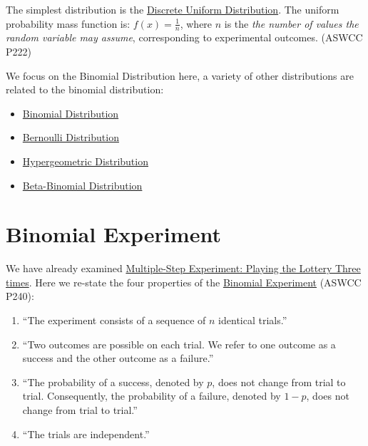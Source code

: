 \documentclass[
]{book}
\providecommand{\tightlist}{%
  \setlength{\itemsep}{0pt}\setlength{\parskip}{0pt}}
\begin{document}
The simplest distribution is the \href{https://en.wikipedia.org/wiki/Discrete_uniform_distribution}{Discrete Uniform Distribution}. The uniform probability mass function is: \(f(x) = \frac{1}{n}\), where \(n\) is the \emph{the number of values the random variable may assume}, corresponding to experimental outcomes. (ASWCC P222)

We focus on the Binomial Distribution here, a variety of other distributions are related to the binomial distribution:

\begin{itemize}
\tightlist
\item
  \href{https://en.wikipedia.org/wiki/Binomial_distribution}{Binomial Distribution}
\item
  \href{https://en.wikipedia.org/wiki/Bernoulli_distribution}{Bernoulli Distribution}
\item
  \href{https://en.wikipedia.org/wiki/Hypergeometric_distribution}{Hypergeometric Distribution}
\item
  \href{https://en.wikipedia.org/wiki/Beta-binomial_distribution}{Beta-Binomial Distribution}
\end{itemize}

\hypertarget{binomial-experiment}{%
\section{Binomial Experiment}\label{binomial-experiment}}

We have already examined \href{https://fanwangecon.github.io/Stat4Econ/probability/htmlpdfr/lottery.html}{Multiple-Step Experiment: Playing the Lottery Three times}. Here we re-state the four properties of the \href{https://en.wikipedia.org/wiki/Binomial_distribution}{Binomial Experiment} (ASWCC P240):

\begin{enumerate}
\def\labelenumi{\arabic{enumi}.}
\tightlist
\item
  ``The experiment consists of a sequence of \(n\) identical trials.''
\item
  ``Two outcomes are possible on each trial. We refer to one outcome as a success and the other outcome as a failure.''
\item
  ``The probability of a success, denoted by \(p\), does not change from trial to trial. Consequently, the probability of a failure, denoted by \(1-p\), does not change from trial to trial.''
\item
  ``The trials are independent.''
\end{enumerate}
\end{document}
